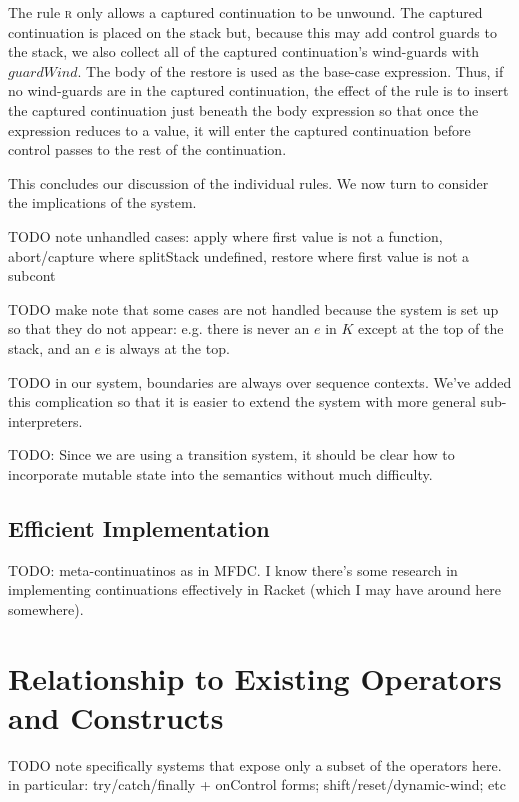 \documentclass[11pt]{article}
\begin{document}
The rule \textsc{r} only allows a captured continuation to be unwound.
The captured continuation is placed on the stack but, because this may add control guards to the stack, we also collect all of the captured continuation's wind-guards with $guardWind$.
The body of the restore is used as the base-case expression.
Thus, if no wind-guards are in the captured continuation, the effect of the rule is to insert the captured continuation just beneath the body expression so that once the expression reduces to a value, it will enter the captured continuation before control passes to the rest of the continuation.




This concludes our discussion of the individual rules.
We now turn to consider the implications of the system.

TODO note unhandled cases: apply where first value is not a function, abort/capture where splitStack undefined, restore where first value is not a subcont

TODO make note that some cases are not handled because the system is set up so that they do not appear: e.g. there is never an $e$ in $K$ except at the top of the stack, and an $e$ is always at the top.

TODO in our system, boundaries are always over sequence contexts. We've added this complication so that it is easier to extend the system with more general sub-interpreters.

TODO: Since we are using a transition system, it should be clear how to incorporate mutable state into the semantics without much difficulty.

\subsection{Efficient Implementation}

TODO: meta-continuatinos as in MFDC. I know there's some research in implementing continuations effectively in Racket (which I may have around here somewhere).


\section{Relationship to Existing Operators and Constructs}
\label{relationship}

TODO note specifically systems that expose only a subset of the operators here. in particular: try/catch/finally + onControl forms; shift/reset/dynamic-wind; etc
\end{document}
